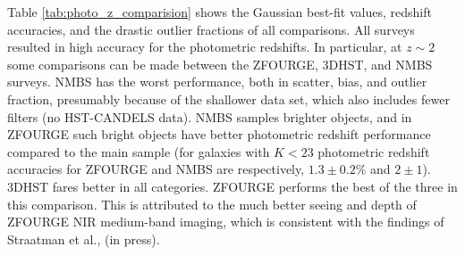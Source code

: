 \documentclass[iop]{emulateapj}
\begin{document}
Table \ref{tab:photo_z_comparision} shows the Gaussian best-fit values, redshift accuracies, and the drastic outlier fractions of all comparisons.  
All surveys resulted in high accuracy for the photometric redshifts. In particular, at $z\sim2$ some comparisons can be made between the ZFOURGE, 3DHST, and NMBS surveys. NMBS has the worst performance, both in scatter, bias, and outlier fraction, presumably because of the shallower data set, which also includes fewer filters (no HST-CANDELS data).  
NMBS  samples brighter objects, and in ZFOURGE  such bright objects have better photometric redshift performance compared to the main sample (for galaxies with $K<23$ photometric redshift accuracies for ZFOURGE and NMBS are respectively, $1.3\pm0.2\%$ and $2\pm1$). 
3DHST fares  better in all categories.  ZFOURGE performs the best of the three in this comparison.
This is attributed to the much better seeing and depth of ZFOURGE NIR medium-band imaging, which is consistent with the findings of Straatman et al., (in press). 
\end{document}
